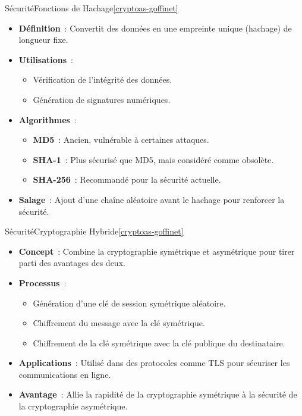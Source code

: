 \documentclass{beamer}
\begin{document}
    \begin{frame}{Sécurité}{Fonctions de Hachage\cref{cryptoas-goffinet}}
        \begin{itemize}
            \item \textbf{Définition}~: Convertit des données en une empreinte unique (hachage) de longueur fixe.
            \item \textbf{Utilisations}~:
            \begin{itemize}
                \item Vérification de l'intégrité des données.
                \item Génération de signatures numériques.
            \end{itemize}
            \item \textbf{Algorithmes}~:
            \begin{itemize}
                \item \textbf{MD5}~: Ancien, vulnérable à certaines attaques.
                \item \textbf{SHA-1}~: Plus sécurisé que MD5, mais considéré comme obsolète.
                \item \textbf{SHA-256}~: Recommandé pour la sécurité actuelle.
            \end{itemize}
            \item \textbf{Salage}~: Ajout d'une chaîne aléatoire avant le hachage pour renforcer la sécurité.
        \end{itemize}
    \end{frame}

    \begin{frame}{Sécurité}{Cryptographie Hybride\cref{cryptoas-goffinet}}
        \begin{itemize}
            \item \textbf{Concept}~: Combine la cryptographie symétrique et asymétrique pour tirer parti des avantages des deux.
            \item \textbf{Processus}~:
            \begin{itemize}
                \item Génération d'une clé de session symétrique aléatoire.
                \item Chiffrement du message avec la clé symétrique.
                \item Chiffrement de la clé symétrique avec la clé publique du destinataire.
            \end{itemize}
            \item \textbf{Applications}~: Utilisé dans des protocoles comme TLS pour sécuriser les communications en ligne.
            \item \textbf{Avantage}~: Allie la rapidité de la cryptographie symétrique à la sécurité de la cryptographie asymétrique.
        \end{itemize}
    \end{frame}
\end{document}
